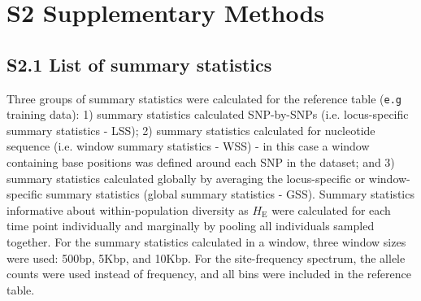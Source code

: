 \documentclass[a4paper, 12pt]{article}
\begin{document}
\begin{table}[ht]
\begin{tabular}{ll}
    \bottomrule
  \end{tabular}
  \label{tab:supple_symbols}
\end{table}

\section*{S2 Supplementary Methods}

\subsection*{S2.1 List of summary statistics}

Three groups of summary statistics were calculated for the reference table (\texttt{e.g} training data): 1) summary statistics calculated SNP-by-SNPs (i.e. locus-specific summary statistics - LSS); 2) summary statistics calculated for nucleotide sequence (i.e. window summary statistics - WSS) - in this case a window containing base positions was defined around each SNP in the dataset; and 3) summary statistics calculated globally by averaging the locus-specific or window-specific summary statistics (global summary statistics - GSS). Summary statistics informative about within-population diversity as $H_{\mathrm{E}}$ were calculated for each time point individually and marginally by pooling all individuals sampled together. For the summary statistics calculated in a window, three window sizes were used: 500bp, 5Kbp, and 10Kbp. For the site-frequency spectrum, the allele counts were used instead of frequency, and all bins were included in the reference table.
\end{document}
